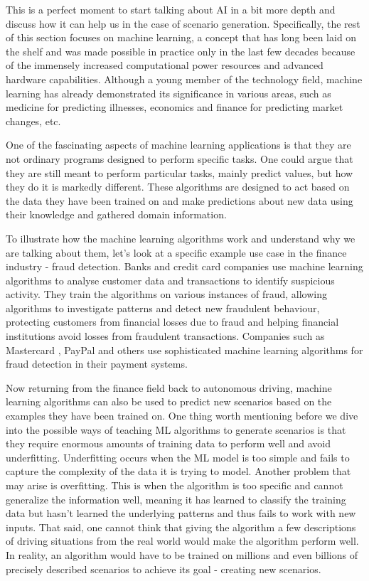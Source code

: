 This is a perfect moment to start talking about AI in a bit more depth and discuss how it can help us in the case of scenario generation. Specifically, the rest of this section focuses on machine learning, a concept that has long been laid on the shelf and was made possible in practice only in the last few decades because of the immensely increased computational power resources and advanced hardware capabilities. Although a young member of the technology field, machine learning has already demonstrated its significance in various areas, such as medicine for predicting illnesses, economics and finance for predicting market changes, etc.

One of the fascinating aspects of machine learning applications is that they are not ordinary programs designed to perform specific tasks. One could argue that they are still meant to perform particular tasks, mainly predict values, but how they do it is markedly different. These algorithms are designed to act based on the data they have been trained on and make predictions about new data using their knowledge and gathered domain information.

To illustrate how the machine learning algorithms work and understand why we are talking about them, let's look at a specific example use case in the finance industry - fraud detection. Banks and credit card companies use machine learning algorithms to analyse customer data and transactions to identify suspicious activity. They train the algorithms on various instances of fraud, allowing algorithms to investigate patterns and detect new fraudulent behaviour, protecting customers from financial losses due to fraud and helping financial institutions avoid losses from fraudulent transactions. Companies such as Mastercard \cite{mastercard_ml}, PayPal \cite{paypal_ml} and others use sophisticated machine learning algorithms for fraud detection in their payment systems.

Now returning from the finance field back to autonomous driving, machine learning algorithms can also be used to predict new scenarios based on the examples they have been trained on. One thing worth mentioning before we dive into the possible ways of teaching ML algorithms to generate scenarios is that they require enormous amounts of training data to perform well and avoid underfitting. Underfitting occurs when the ML model is too simple and fails to capture the complexity of the data it is trying to model. Another problem that may arise is overfitting. This is when the algorithm is too specific and cannot generalize the information well, meaning it has learned to classify the training data but hasn't learned the underlying patterns and thus fails to work with new inputs. That said, one cannot think that giving the algorithm a few descriptions of driving situations from the real world would make the algorithm perform well. In reality, an algorithm would have to be trained on millions and even billions of precisely described scenarios to achieve its goal - creating new scenarios. 

